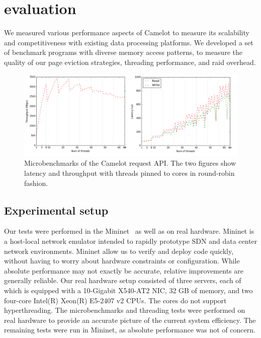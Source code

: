 \section{evaluation}
\label{sec:eval}
We measured various performance aspects of Camelot to measure its
scalability and competitiveness with existing data processing
platforms. We developed a set of benchmark programs with diverse
memory access patterns, to measure the quality of our page eviction
strategies, threading performance, and raid overhead.
\begin{figure}[h]
	\includegraphics[width=\textwidth]{fig/threads_pinned}
	\caption{Microbenchmarks of the Camelot request API. The two figures show latency and throughput 
	with threads pinned to cores in round-robin fashion.}
	\label{fig:threads}
\end{figure}
\subsection{Experimental setup}
Our tests were performed in the Mininet~\cite{mininet} as well as on real hardware.
Mininet is a host-local network emulator intended to rapidly prototype SDN and data center network environments. Mininet allow us to verify and deploy code quickly, without having to worry about hardware constraints or configuration. While absolute performance may not exactly be accurate, relative improvements are generally reliable. 
Our real hardware setup consisted of three servers, each of which is equipped with a 10-Gigabit X540-AT2 NIC, 32 GB of memory, and two four-core Intel(R) Xeon(R) E5-2407 v2 CPUs. The cores do not support hyperthreading.
The microbenchmarks and threading tests were performed on real hardware to provide an accurate picture of the current system efficiency. The remaining tests were run in Mininet, as absolute performance was not of concern.

